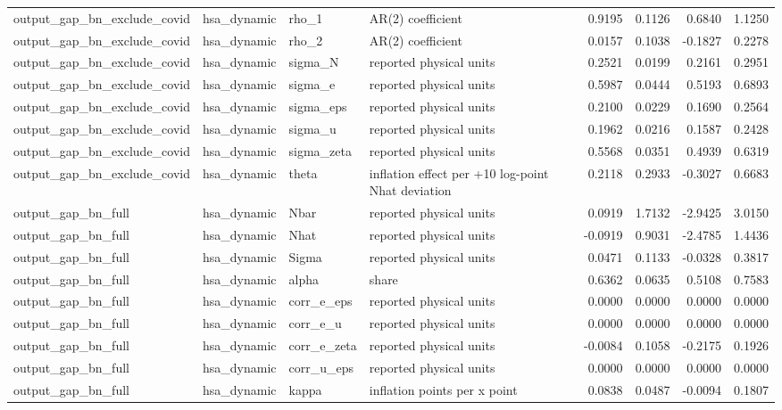 \begin{tabular}{llllrrrr}
output\_gap\_bn\_exclude\_covid & hsa\_dynamic & rho\_1 & AR(2) coefficient & 0.9195 & 0.1126 & 0.6840 & 1.1250 \\
output\_gap\_bn\_exclude\_covid & hsa\_dynamic & rho\_2 & AR(2) coefficient & 0.0157 & 0.1038 & -0.1827 & 0.2278 \\
output\_gap\_bn\_exclude\_covid & hsa\_dynamic & sigma\_N & reported physical units & 0.2521 & 0.0199 & 0.2161 & 0.2951 \\
output\_gap\_bn\_exclude\_covid & hsa\_dynamic & sigma\_e & reported physical units & 0.5987 & 0.0444 & 0.5193 & 0.6893 \\
output\_gap\_bn\_exclude\_covid & hsa\_dynamic & sigma\_eps & reported physical units & 0.2100 & 0.0229 & 0.1690 & 0.2564 \\
output\_gap\_bn\_exclude\_covid & hsa\_dynamic & sigma\_u & reported physical units & 0.1962 & 0.0216 & 0.1587 & 0.2428 \\
output\_gap\_bn\_exclude\_covid & hsa\_dynamic & sigma\_zeta & reported physical units & 0.5568 & 0.0351 & 0.4939 & 0.6319 \\
output\_gap\_bn\_exclude\_covid & hsa\_dynamic & theta & inflation effect per +10 log-point Nhat deviation & 0.2118 & 0.2933 & -0.3027 & 0.6683 \\
output\_gap\_bn\_full & hsa\_dynamic & Nbar & reported physical units & 0.0919 & 1.7132 & -2.9425 & 3.0150 \\
output\_gap\_bn\_full & hsa\_dynamic & Nhat & reported physical units & -0.0919 & 0.9031 & -2.4785 & 1.4436 \\
output\_gap\_bn\_full & hsa\_dynamic & Sigma & reported physical units & 0.0471 & 0.1133 & -0.0328 & 0.3817 \\
output\_gap\_bn\_full & hsa\_dynamic & alpha & share & 0.6362 & 0.0635 & 0.5108 & 0.7583 \\
output\_gap\_bn\_full & hsa\_dynamic & corr\_e\_eps & reported physical units & 0.0000 & 0.0000 & 0.0000 & 0.0000 \\
output\_gap\_bn\_full & hsa\_dynamic & corr\_e\_u & reported physical units & 0.0000 & 0.0000 & 0.0000 & 0.0000 \\
output\_gap\_bn\_full & hsa\_dynamic & corr\_e\_zeta & reported physical units & -0.0084 & 0.1058 & -0.2175 & 0.1926 \\
output\_gap\_bn\_full & hsa\_dynamic & corr\_u\_eps & reported physical units & 0.0000 & 0.0000 & 0.0000 & 0.0000 \\
output\_gap\_bn\_full & hsa\_dynamic & kappa & inflation points per x point & 0.0838 & 0.0487 & -0.0094 & 0.1807 \\

\end{tabular}
